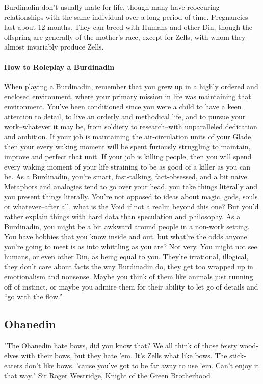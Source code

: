 \documentclass[oneside,11pt,english]{book}
\begin{document}
Burdinadin don’t usually mate for life, though many have reoccuring relationships with the same individual over a long period of time. Pregnancies last about 12 months. They can breed with Humans and other Din, though the offspring are generally of the mother's race, except for Zells, with whom they almost invariably produce Zells. 
\paragraph{How to Roleplay a Burdinadin}
When playing a Burdinadin, remember that you grew up in a highly ordered and enclosed environment, where your primary mission in life was maintaining that environment. You’ve been conditioned since you 
were a child to have a keen attention to detail, to live an orderly and methodical life, and to pursue your work--whatever it may be, from soldiery to research--with unparalleled dedication and ambition. If your job is maintaining the air-circulation units of your Glade, then your every waking moment will be spent furiously struggling to maintain, improve and perfect that unit. If your job is killing people, then you will spend every waking moment of your life straining to be as good of a killer as you can be. As a Burdinadin, you’re smart, fast-talking, fact-obsessed, and a bit naive. Metaphors and analogies tend to go over your head, you take things literally and you present things literally. You’re not opposed to ideas about magic, gods, souls or whatever--after all, what is the Void if not a realm beyond this one? But you’d rather explain things with hard data than speculation and philosophy. As a Burdinadin, you might be a bit awkward around people in a non-work setting. You have hobbies that you know inside and out, but what’re the odds anyone you’re going to meet is as into whittling as you are? Not very. You might not see humans, or even other Din, as being equal to you. They’re irrational, illogical, they don’t care about 
facts the way Burdinadin do, they get too wrapped up in emotionalism and nonsense. Maybe you think of them like animals just running off of instinct, or maybe you admire them for their ability to let go of 
details and “go with the flow.” 
\subsection{Ohanedin}
"The Ohanedin hate bows, did you know that? We all think of those feisty wood-elves with their bows, but they hate 'em. It's Zells 
what like bows. The stick-eaters don't like bows, 'cause you've got to be far away to use 'em. Can't enjoy it that way." 
Sir Roger Westridge, Knight of the Green Brotherhood 
 
\end{document}
